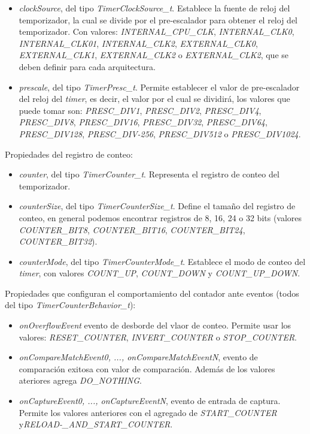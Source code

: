 \begin{itemize}
\item
\emph{clockSource}, del tipo \emph{TimerClockSource\_t}. Establece la fuente de reloj del temporizador, la cual se divide por el pre-escalador para obtener el reloj del temporizador. Con valores: \emph{INTERNAL\_CPU\_CLK}, \emph{INTERNAL\_CLK0}, \emph{INTERNAL\_CLK01}, \emph{INTERNAL\_CLK2}, \emph{EXTERNAL\_CLK0}, \emph{EXTERNAL\_CLK1}, \emph{EXTERNAL\_CLK2} o \emph{EXTERNAL\_CLK2}, que se deben definir para cada arquitectura.
\item
\emph{prescale}, del tipo \emph{TimerPresc\_t}. Permite establecer el valor de pre-escalador del reloj del \emph{timer}, es decir, el valor por el cual se dividirá, los valores que puede tomar son: \emph{PRESC\_DIV1}, \emph{PRESC\_DIV2}, \emph{PRESC\_DIV4}, \emph{PRESC\_DIV8}, \emph{PRESC\_DIV16}, \emph{PRESC\_DIV32}, \emph{PRESC\_DIV64}, \emph{PRESC\_DIV128}, \emph{PRESC\_DIV-256}, \emph{PRESC\_DIV512} o \emph{PRESC\_DIV1024}.
\end{itemize}

Propiedades del registro de conteo:

\begin{itemize}
\item
\emph{counter}, del tipo \emph{TimerCounter\_t}. Representa el registro de conteo del temporizador.
\item
\emph{counterSize}, del tipo \emph{TimerCounterSize\_t}. Define el tamaño del registro de conteo, en general podemos encontrar registros de 8, 16, 24 o 32 bits (valores \emph{COUNTER\_BIT8}, \emph{COUNTER\_BIT16}, \emph{COUNTER\_BIT24}, \emph{COUNTER\_BIT32}).
\item
\emph{counterMode}, del tipo \emph{TimerCounterMode\_t}. Establece el modo de conteo del \emph{timer}, con valores \emph{COUNT\_UP}, \emph{COUNT\_DOWN} y \emph{COUNT\_UP\_DOWN}.
\end{itemize}

Propiedades que configuran el comportamiento del contador ante eventos (todos del tipo \emph{TimerCounterBehavior\_t}):  

\begin{itemize}
\item
\emph{onOverflowEvent} evento de desborde del vlaor de conteo. Permite usar los valores: \emph{RESET\_COUNTER}, \emph{INVERT\_COUNTER} o \emph{STOP\_COUNTER}.
\item
\emph{onCompareMatchEvent0, ..., onCompareMatchEventN}, evento de comparación exitosa con valor de comparación. Además de los valores ateriores agrega \emph{DO\_NOTHING}.
\item
\emph{onCaptureEvent0, ..., onCaptureEventN}, evento de entrada de captura. Permite los valores anteriores con el agregado de \emph{START\_COUNTER} y\emph{RELOAD-\_AND\_START\_COUNTER}.
\end{itemize}

